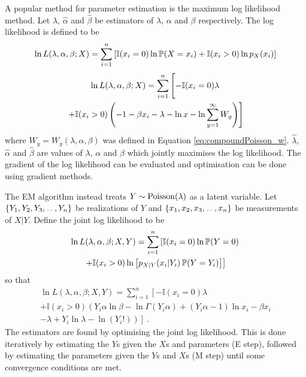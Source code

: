 A popular method for parameter estimation is the maximum log likelihood method. Let $\widehat{\lambda}$, $\widehat{\alpha}$ and $\widehat{\beta}$ be estimators of $\lambda$, $\alpha$ and $\beta$ respectively. The log likelihood is defined to be
\begin{equation*}
	\ln L(\lambda,\alpha,\beta;X) = \sum_{i=1}^n
	\left[
		\mathbb{I}(x_i=0)\ln \operatorname{\mathbb{P}}(X=x_i)
		+\mathbb{I}(x_i>0)\ln p_X(x_i)
	\right]
\end{equation*}
\begin{multline}
	\ln L(\lambda,\alpha,\beta;X) = \sum_{i=1}^n
	\left[
		-\mathbb{I}(x_i=0)\lambda
		\vphantom{\sum_i^i}
	\right.
	\\
	\left.
		+\mathbb{I}(x_i>0)\left(
		-1-\beta x_i-\lambda-\ln x -\ln\sum_{y=1}^\infty W_y
		\right)
	\right]
\end{multline}
where $W_y=W_y(\lambda,\alpha,\beta)$ was defined in Equation \eqref{eq:compoundPoisson_w}. $\widehat{\lambda}$, $\widehat{\alpha}$ and $\widehat{\beta}$ are values of $\lambda$, $\alpha$ and $\beta$ which jointly maximises the log likelihood. The gradient of the log likelihood can be evaluated \citep{dunn2005series} and optimisation can be done using gradient methods.

The EM algorithm \citep{dempster1977maximum} instead treats $Y\sim\operatorname{Poisson}(\lambda)$ as a latent variable. Let $\left\{Y_1,Y_2,Y_3,\dotdotdot, Y_n\right\}$ be realizations of $Y$ and $\left\{x_1,x_2,x_3,\dotdotdot, x_n\right\}$ be measurements of $X|Y$. Define the joint log likelihood to be
\begin{multline*}
	\ln L(\lambda,\alpha,\beta;X,Y)
	=
	\sum_{i=1}^n
	\left[
		\mathbb{I}(x_i=0)
		\ln
		\operatorname{\mathbb{P}}(Y=0)
	\right.
	\\
	\left.
		+
		\mathbb{I}(x_i>0)
		\ln
		\left[
			p_{X|Y}(x_i|Y_i)\operatorname{\mathbb{P}}(Y=Y_i)
		\right]
	\right]
\end{multline*}
so that
\begin{multline}
	\ln L(\lambda,\alpha,\beta;X,Y)=
	\sum_{i=1}^n
	\left[
		-\mathbb{I}(x_i=0)
		\lambda
	\right.
	\\
	\left.+
		\mathbb{I}(x_i>0)
		\left(
			Y_i\alpha\ln\beta-\ln\Gamma(Y_i\alpha)+(Y_i\alpha-1)\ln x_i - \beta x_i
		\right.
	\right.
	\\
	\left.
		\left.	
			- \lambda + Y_i \ln \lambda - \ln(Y_i!)
		\right)
	\right]
	\ .
\end{multline}
The estimators are found by optimising the joint log likelihood. This is done iteratively by estimating the $Y$s given the $X$s and parameters (E step), followed by estimating the parameters given the $Y$s and $X$s (M step) until some convergence conditions are met.

